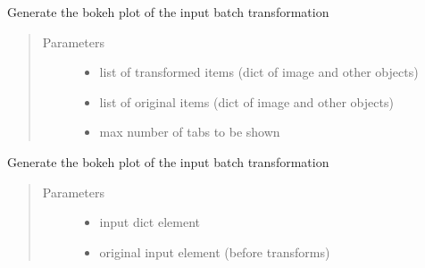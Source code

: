 \documentclass[letterpaper,10pt,english]{sphinxmanual}
\begin{document}
\begin{fulllineitems}
\label{\detokenize{ida_lib:ida_lib.visualization.visualize}}
Generate the bokeh plot of the input batch transformation
\begin{quote}\begin{description}
\item[{Parameters}] \leavevmode\begin{itemize}
\item {} 
 \textendash{} list of transformed items (dict of image and other  objects)

\item {} 
 \textendash{} list of original items (dict of image and other  objects)

\item {} 
 \textendash{} max number of tabs to be shown

\end{itemize}

\end{description}\end{quote}

\end{fulllineitems}


\begin{fulllineitems}
\label{\detokenize{ida_lib:ida_lib.visualization.plot_image_transformation}}
Generate the bokeh plot of the input batch transformation
\begin{quote}\begin{description}
\item[{Parameters}] \leavevmode\begin{itemize}
\item {} 
 \textendash{} input dict element

\item {} 
 \textendash{} original input element (before transforms)

\end{itemize}

\end{description}\end{quote}

\end{fulllineitems}
\end{document}
